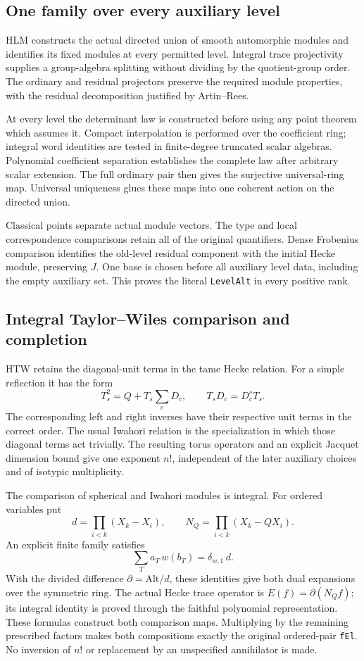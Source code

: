\documentclass[11pt,a4paper]{article}
\numberwithin{equation}{section}
\theoremstyle{remark}\newtheorem{remark}[theorem]{Remark}
\begin{document}
\subsection{One family over every auxiliary level}

HLM constructs the actual directed union of smooth automorphic
modules and identifies its fixed modules at every permitted
level.  Integral trace projectivity supplies a group-algebra
splitting without dividing by the quotient-group order.  The
ordinary and residual projectors preserve the required module
properties, with the residual decomposition justified by
Artin--Rees.

At every level the determinant law is constructed before using
any point theorem which assumes it.  Compact interpolation is
performed over the coefficient ring; integral word identities
are tested in finite-degree truncated scalar algebras.  Polynomial
coefficient separation establishes the complete law after
arbitrary scalar extension.  The full ordinary pair then gives
the surjective universal-ring map.  Universal uniqueness glues
these maps into one coherent action on the directed union.

Classical points separate actual module vectors.  The type and
local correspondence comparisons retain all of the original
quantifiers.  Dense Frobenius comparison identifies the old-level
residual component with the initial Hecke module, preserving
$J$.  One base is chosen before all auxiliary level data,
including the empty auxiliary set.  This proves the literal
\texttt{Level\allowbreak Alt} in every positive rank.

\subsection{Integral Taylor--Wiles comparison and completion}

HTW retains the diagonal-unit terms in the tame Hecke relation.
For a simple reflection it has the form
\[
 T_s^2=Q+T_s\sum_c D_c,\qquad T_sD_c=D_c^sT_s.
\]
The corresponding left and right inverses have their respective
unit terms in the correct order.  The usual Iwahori relation is
the specialization in which those diagonal terms act trivially.
The resulting torus operators and an explicit Jacquet dimension
bound give one exponent $n!$, independent of the later auxiliary
choices and of isotypic multiplicity.

The comparison of spherical and Iwahori modules is integral.
For ordered variables put
\[
 d=\prod_{i<k}(X_k-X_i),\qquad
 N_Q=\prod_{i<k}(X_k-QX_i).
\]
An explicit finite family satisfies
\[
              \sum_T a_T\,w(b_T)=\delta_{w,1}\,d.
\]
With the divided difference $\partial=\mathrm{Alt}/d$, these
identities give both dual expansions over the symmetric ring.
The actual Hecke trace operator is
$E(f)=\partial(N_Qf)$; its integral identity is proved through
the faithful polynomial representation.  These formulas construct
both comparison maps.  Multiplying by the remaining prescribed
factors makes both compositions exactly the original ordered-pair
\texttt{f\allowbreak El}.  No inversion of $n!$ or replacement by an
unspecified annihilator is made.
\end{document}
